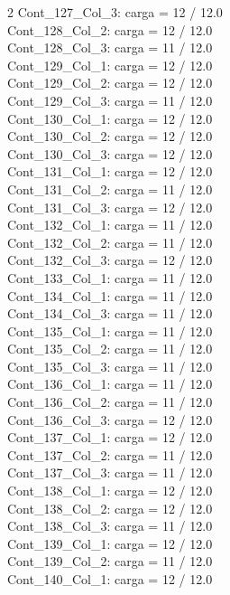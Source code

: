 \begin{multicols}{2}
Cont\_127\_Col\_3: carga = 12 / 12.0\\
Cont\_128\_Col\_2: carga = 12 / 12.0\\
Cont\_128\_Col\_3: carga = 11 / 12.0\\
Cont\_129\_Col\_1: carga = 12 / 12.0\\
Cont\_129\_Col\_2: carga = 12 / 12.0\\
Cont\_129\_Col\_3: carga = 11 / 12.0\\
Cont\_130\_Col\_1: carga = 12 / 12.0\\
Cont\_130\_Col\_2: carga = 12 / 12.0\\
Cont\_130\_Col\_3: carga = 12 / 12.0\\
Cont\_131\_Col\_1: carga = 12 / 12.0\\
Cont\_131\_Col\_2: carga = 11 / 12.0\\
Cont\_131\_Col\_3: carga = 12 / 12.0\\
Cont\_132\_Col\_1: carga = 11 / 12.0\\
Cont\_132\_Col\_2: carga = 11 / 12.0\\
Cont\_132\_Col\_3: carga = 12 / 12.0\\
Cont\_133\_Col\_1: carga = 11 / 12.0\\
Cont\_134\_Col\_1: carga = 11 / 12.0\\
Cont\_134\_Col\_3: carga = 11 / 12.0\\
Cont\_135\_Col\_1: carga = 11 / 12.0\\
Cont\_135\_Col\_2: carga = 11 / 12.0\\
Cont\_135\_Col\_3: carga = 11 / 12.0\\
Cont\_136\_Col\_1: carga = 11 / 12.0\\
Cont\_136\_Col\_2: carga = 11 / 12.0\\
Cont\_136\_Col\_3: carga = 12 / 12.0\\
Cont\_137\_Col\_1: carga = 12 / 12.0\\
Cont\_137\_Col\_2: carga = 11 / 12.0\\
Cont\_137\_Col\_3: carga = 11 / 12.0\\
Cont\_138\_Col\_1: carga = 12 / 12.0\\
Cont\_138\_Col\_2: carga = 12 / 12.0\\
Cont\_138\_Col\_3: carga = 11 / 12.0\\
Cont\_139\_Col\_1: carga = 12 / 12.0\\
Cont\_139\_Col\_2: carga = 11 / 12.0\\
Cont\_140\_Col\_1: carga = 12 / 12.0\\

\end{multicols}
